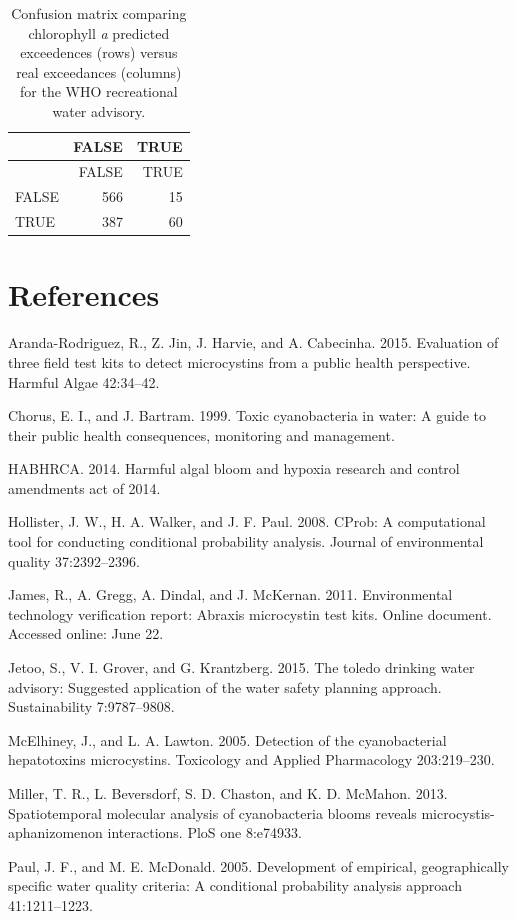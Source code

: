 \documentclass[11pt,]{article}
\begin{document}
\newpage

\begin{longtable}[c]{@{}lrr@{}}
\caption{Confusion matrix comparing chlorophyll \textit{a} predicted
exceedences (rows) versus real exceedances (columns) for the WHO
recreational water advisory.
\label{tab:who_rec_conmat_table}}\tabularnewline
\toprule
& FALSE & TRUE\tabularnewline
\midrule
\endfirsthead
\toprule
& FALSE & TRUE\tabularnewline
\midrule
\endhead
FALSE & 566 & 15\tabularnewline
TRUE & 387 & 60\tabularnewline
\bottomrule
\end{longtable}

\newpage

\section*{References}\label{references}

Aranda-Rodriguez, R., Z. Jin, J. Harvie, and A. Cabecinha. 2015.
Evaluation of three field test kits to detect microcystins from a public
health perspective. Harmful Algae 42:34--42.

Chorus, E. I., and J. Bartram. 1999. Toxic cyanobacteria in water: A
guide to their public health consequences, monitoring and management.

HABHRCA. 2014. Harmful algal bloom and hypoxia research and control
amendments act of 2014.

Hollister, J. W., H. A. Walker, and J. F. Paul. 2008. CProb: A
computational tool for conducting conditional probability analysis.
Journal of environmental quality 37:2392--2396.

James, R., A. Gregg, A. Dindal, and J. McKernan. 2011. Environmental
technology verification report: Abraxis microcystin test kits. Online
document. Accessed online: June 22.

Jetoo, S., V. I. Grover, and G. Krantzberg. 2015. The toledo drinking
water advisory: Suggested application of the water safety planning
approach. Sustainability 7:9787--9808.

McElhiney, J., and L. A. Lawton. 2005. Detection of the cyanobacterial
hepatotoxins microcystins. Toxicology and Applied Pharmacology
203:219--230.

Miller, T. R., L. Beversdorf, S. D. Chaston, and K. D. McMahon. 2013.
Spatiotemporal molecular analysis of cyanobacteria blooms reveals
microcystis-aphanizomenon interactions. PloS one 8:e74933.

Paul, J. F., and M. E. McDonald. 2005. Development of empirical,
geographically specific water quality criteria: A conditional
probability analysis approach 41:1211--1223.
\end{document}
